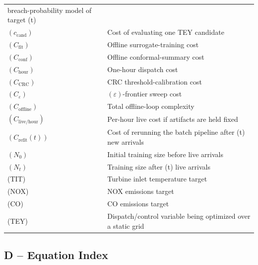 \documentclass[11pt]{article}
\begin{document}
{\begin{longtable}[]{@{}
  >{\raggedright\arraybackslash}p{}
  >{\raggedright\arraybackslash}p{}@{}}
breach-probability model of target (t) \\
\(\left( c_{\text{cand}} \right)\) & Cost of evaluating one TEY
candidate \\
\(\left( C_{\text{fit}} \right)\) & Offline surrogate-training cost \\
\(\left( C_{\text{conf}} \right)\) & Offline conformal-summary cost \\
\(\left( C_{\text{hour}} \right)\) & One-hour dispatch cost \\
\(\left( C_{\text{CRC}} \right)\) & CRC threshold-calibration cost \\
\(\left( C_{\varepsilon} \right)\) & \((\varepsilon)\)-frontier sweep
cost \\
\(\left( C_{\text{offline}} \right)\) & Total offline-loop complexity \\
\(\left( C_{\text{live/hour}} \right)\) & Per-hour live cost if
artifacts are held fixed \\
\(\left( C_{\text{refit}}(t) \right)\) & Cost of rerunning the batch
pipeline after (t) new arrivals \\
\(\left( N_{0} \right)\) & Initial training size before live arrivals \\
\(\left( N_{t} \right)\) & Training size after (t) live arrivals \\
(TIT) & Turbine inlet temperature target \\
(NOX) & NOX emissions target \\
(CO) & CO emissions target \\
(TEY) & Dispatch/control variable being optimized over a static grid \\
\end{longtable}
}

\subsection{D -- Equation Index}\label{d-equation-index}

\subsection{}\label{section-32}
\end{document}
